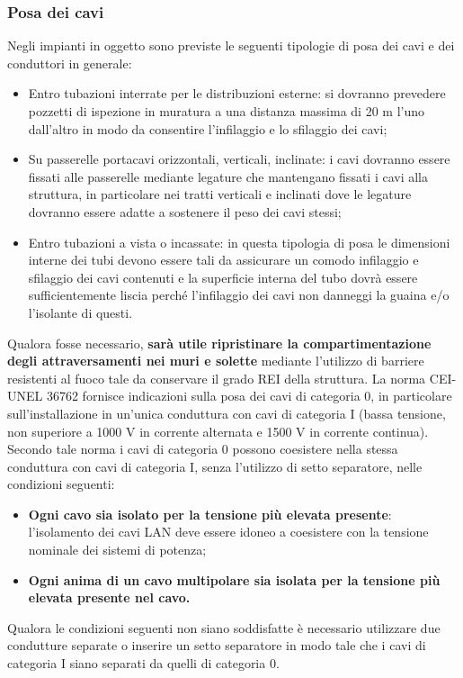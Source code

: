 \subsubsection{Posa dei cavi}
Negli impianti in oggetto sono previste le seguenti tipologie di posa dei cavi e dei conduttori in generale:
\begin{itemize}
    \item Entro tubazioni interrate per le distribuzioni esterne: si dovranno prevedere pozzetti di ispezione in muratura a una distanza massima di 20 m l’uno dall’altro in modo da consentire l’infilaggio e lo sfilaggio dei cavi;
    \item Su passerelle portacavi orizzontali, verticali, inclinate: i cavi dovranno essere fissati alle passerelle mediante legature che mantengano fissati i cavi alla struttura, in particolare nei tratti verticali e inclinati dove le legature dovranno essere adatte a sostenere il peso dei cavi stessi;
    \item Entro tubazioni a vista o incassate: in questa tipologia di posa le dimensioni interne dei tubi devono essere tali da assicurare un comodo infilaggio e sfilaggio dei cavi contenuti e la superficie interna del tubo dovrà essere sufficientemente liscia perché l’infilaggio dei cavi non danneggi la guaina e/o l’isolante di questi.
\end{itemize}
Qualora fosse necessario, \textbf{sarà utile ripristinare la compartimentazione degli attraversamenti nei muri e solette} mediante l’utilizzo di barriere resistenti al fuoco tale da conservare il grado REI della struttura.
La norma CEI-UNEL 36762 fornisce indicazioni sulla posa dei cavi di categoria 0, in particolare sull’installazione in un’unica conduttura con cavi di categoria I (bassa tensione, non superiore a 1000 V in corrente alternata e 1500 V in corrente continua). Secondo tale norma i cavi di categoria 0 possono coesistere nella stessa conduttura con cavi di categoria I, senza l’utilizzo di setto separatore, nelle condizioni seguenti: 
\begin{itemize}
    \item \textbf{Ogni cavo sia isolato per la tensione più elevata presente}: l’isolamento dei cavi LAN deve essere idoneo a coesistere con la tensione nominale dei sistemi di potenza;
    \item \textbf{Ogni anima di un cavo multipolare sia isolata per la tensione più elevata presente nel cavo.}
\end{itemize}
Qualora le condizioni seguenti non siano soddisfatte è necessario utilizzare due condutture separate o inserire un setto separatore in modo tale che i cavi di categoria I siano separati da quelli di categoria 0.


